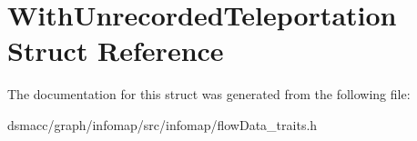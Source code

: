 \hypertarget{structWithUnrecordedTeleportation}{}\section{With\+Unrecorded\+Teleportation Struct Reference}
\label{structWithUnrecordedTeleportation}


The documentation for this struct was generated from the following file\+:\begin{DoxyCompactItemize}
\item 
dsmacc/graph/infomap/src/infomap/flow\+Data\+\_\+traits.\+h\end{DoxyCompactItemize}
